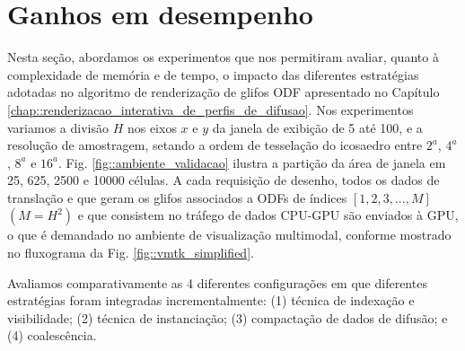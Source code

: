 
\section{Ganhos em desempenho}
\label{sec::funcionalidades_agregadas_e_ganhos_de_performance}

Nesta seção, abordamos os experimentos que nos permitiram avaliar, quanto à complexidade de memória e de tempo, o impacto das diferentes estratégias adotadas no algoritmo de renderização de glifos ODF apresentado no Capítulo \ref{chap::renderizacao_interativa_de_perfis_de_difusao}.
Nos experimentos variamos a divisão $H$ nos eixos $x$ e $y$ da janela de exibição de 5 até 100, e a resolução de amostragem, setando a ordem de tesselação do icosaedro entre $2^a$, $4^a$, $8^a$ e $16^a$. Fig. \ref{fig::ambiente_validacao} ilustra a partição da área de janela em 25, 625, 2500 e 10000 células. A cada requisição de desenho, todos os dados de translação e que geram os glifos associados a ODFs de índices $[1, 2, 3, ..., M]$ $(M = H^2)$ e que consistem no tráfego de dados CPU-GPU são enviados à GPU, o que é demandado no ambiente de visualização multimodal, conforme mostrado no fluxograma da Fig. \ref{fig::vmtk_simplified}.

 Avaliamos comparativamente as 4 diferentes configurações em que diferentes estratégias foram integradas incrementalmente: (1) técnica de indexação e visibilidade; (2) técnica de instanciação; (3) compactação de dados de difusão; e (4) coalescência.
 


